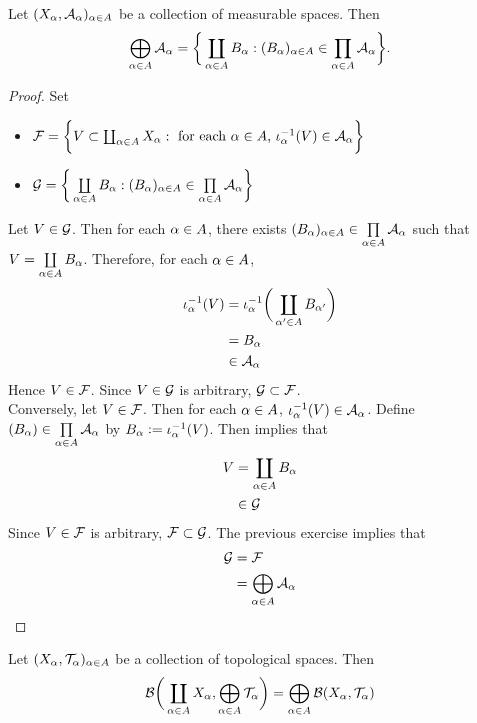 \documentclass{book}
\begin{document}
	\begin{ex} 
		Let $(X_{\alpha}, \mathcal{A}_{\alpha})_{\alpha \in A}$ be a collection of measurable spaces. Then 
		$$\bigoplus\limits_{\alpha \in A} \mathcal{A}_{\alpha} = \bigg \{\coprod_{\alpha \in A} B_{\alpha}: (B_{\alpha})_{\alpha \in A} \in \prod\limits_{\alpha \in A} \mathcal{A}_{\alpha} \bigg\}. $$
	\end{ex}

	\begin{proof}
		Set  
		\begin{itemize}
			\item $\mathcal{F}= \bigg\{ V \subset \coprod_{\alpha \in A}  X_{\alpha}: \text{ for each $\alpha \in A$, $\iota_{\alpha}^{-1}(V) \in \mathcal{A}_{\alpha}$} \bigg \}$ 
			\item $\mathcal{G} = \bigg \{  \coprod\limits_{\alpha \in A}  B_{\alpha}: (B_{\alpha})_{\alpha \in A} \in \prod\limits_{\alpha \in A} \mathcal{A}_{\alpha} \bigg\}$
			\end{itemize}
			Let $V \in \mathcal{G}$. Then for each $\alpha \in A$, there exists $(B_{\alpha})_{\alpha \in A} \in \prod\limits_{\alpha \in A} \mathcal{A}_{\alpha}$ such that $V =  \coprod\limits_{\alpha \in A}  B_{\alpha}$. Therefore, for each $\alpha \in A$, 
			\begin{align*}
				\iota_{\alpha}^{-1}(V)
				& = \iota_{\alpha}^{-1} \bigg( \coprod\limits_{\alpha' \in A}  B_{\alpha'} \bigg) \\
				& = B_{\alpha} \\
				& \in \mathcal{A}_{\alpha}
			\end{align*}
			Hence $V \in \mathcal{F}$. Since $V \in \mathcal{G}$ is arbitrary, $\mathcal{G} \subset \mathcal{F}$. \\
			Conversely, let $V \in \mathcal{F}$. Then for each $\alpha \in A$, $\iota_{\alpha}^{-1}(V) \in \mathcal{A}_{\alpha}$. Define $(B_{\alpha}) \in \prod\limits_{\alpha \in A} \mathcal{A}_{\alpha}$ by $B_{\alpha} \vcentcolon= \iota_{\alpha}^{-1}(V)$. Then  implies that
			\begin{align*}
				V 
				& = \coprod\limits_{\alpha \in A} B_{\alpha} \\
				& \in \mathcal{G} 
			\end{align*}
			Since $V \in \mathcal{F}$ is arbitrary, $\mathcal{F} \subset \mathcal{G}$. The previous exercise implies that 
			\begin{align*}
				\mathcal{G}
				& = \mathcal{F} \\
				& = \bigoplus\limits_{\alpha \in A} \mathcal{A}_{\alpha}
			\end{align*}
	\end{proof}
	
	\begin{ex}
		Let $(X_{\alpha}, \mathcal{T}_{\alpha})_{\alpha \in A}$ be a collection of topological spaces. Then 
		$$\mathcal{B} \bigg( \coprod\limits_{\alpha \in A} X_{\alpha}, \bigoplus\limits_{\alpha \in A} \mathcal{T}_{\alpha} \bigg) = \bigoplus\limits_{\alpha \in A} \mathcal{B}(X_{\alpha}, \mathcal{T}_{\alpha})$$
	\end{ex}
\end{document}
